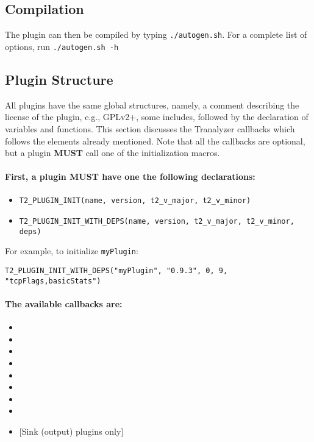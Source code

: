\documentclass[documentation]{subfiles}
\begin{document}
\subsection{Compilation}
The plugin can then be compiled by typing {\tt ./autogen.sh}.
For a complete list of options, run {\tt ./autogen.sh -h}


\subsection{Plugin Structure}

All plugins have the same global structures, namely, a comment describing the license of the plugin, e.g., GPLv2+, some includes, followed by the declaration of variables and functions.
This section discusses the Tranalyzer callbacks which follows the elements already mentioned.
Note that all the callbacks are optional, but a plugin {\bf MUST} call one of the initialization macros.

\paragraph{First, a plugin {\bf MUST} have one the following declarations:}
\begin{itemize}
    \item {\tt T2\_PLUGIN\_INIT(name, version, t2\_v\_major, t2\_v\_minor)}
    \item {\tt T2\_PLUGIN\_INIT\_WITH\_DEPS(name, version, t2\_v\_major, t2\_v\_minor, deps)}
\end{itemize}
For example, to initialize {\tt myPlugin}:
\begin{center}
{\tt T2\_PLUGIN\_INIT\_WITH\_DEPS("myPlugin", "0.9.3", 0, 9, "tcpFlags,basicStats")}
\end{center}

\paragraph{The available callbacks are:}
\begin{itemize}
    \item {\tt{}}
    \item {\tt{}}
    \item {\tt{}}
    \item {\tt{}}
    \item {\tt{}}
    \item {\tt{}}
    \item {\tt{}}
    \item {\tt{}}
    \item {\tt{}} [Sink (output) plugins only]
\end{itemize}
\end{document}
